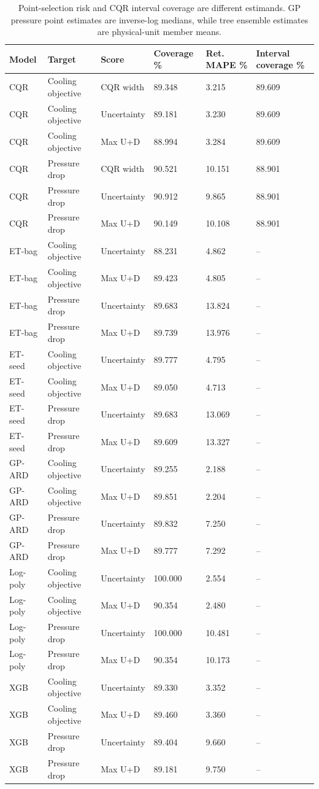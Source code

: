 \begin{table}[htbp]\centering\small\setlength{\tabcolsep}{3pt}\begin{tabular}{llllll}
\toprule
Model & Target & Score & Coverage \% & Ret. MAPE \% & Interval coverage \%\\\midrule
CQR & Cooling objective & CQR width & 89.348 & 3.215 & 89.609\\
CQR & Cooling objective & Uncertainty & 89.181 & 3.230 & 89.609\\
CQR & Cooling objective & Max U+D & 88.994 & 3.284 & 89.609\\
CQR & Pressure drop & CQR width & 90.521 & 10.151 & 88.901\\
CQR & Pressure drop & Uncertainty & 90.912 & 9.865 & 88.901\\
CQR & Pressure drop & Max U+D & 90.149 & 10.108 & 88.901\\
ET-bag & Cooling objective & Uncertainty & 88.231 & 4.862 & --\\
ET-bag & Cooling objective & Max U+D & 89.423 & 4.805 & --\\
ET-bag & Pressure drop & Uncertainty & 89.683 & 13.824 & --\\
ET-bag & Pressure drop & Max U+D & 89.739 & 13.976 & --\\
ET-seed & Cooling objective & Uncertainty & 89.777 & 4.795 & --\\
ET-seed & Cooling objective & Max U+D & 89.050 & 4.713 & --\\
ET-seed & Pressure drop & Uncertainty & 89.683 & 13.069 & --\\
ET-seed & Pressure drop & Max U+D & 89.609 & 13.327 & --\\
GP-ARD & Cooling objective & Uncertainty & 89.255 & 2.188 & --\\
GP-ARD & Cooling objective & Max U+D & 89.851 & 2.204 & --\\
GP-ARD & Pressure drop & Uncertainty & 89.832 & 7.250 & --\\
GP-ARD & Pressure drop & Max U+D & 89.777 & 7.292 & --\\
Log-poly & Cooling objective & Uncertainty & 100.000 & 2.554 & --\\
Log-poly & Cooling objective & Max U+D & 90.354 & 2.480 & --\\
Log-poly & Pressure drop & Uncertainty & 100.000 & 10.481 & --\\
Log-poly & Pressure drop & Max U+D & 90.354 & 10.173 & --\\
XGB & Cooling objective & Uncertainty & 89.330 & 3.352 & --\\
XGB & Cooling objective & Max U+D & 89.460 & 3.360 & --\\
XGB & Pressure drop & Uncertainty & 89.404 & 9.660 & --\\
XGB & Pressure drop & Max U+D & 89.181 & 9.750 & --\\
\bottomrule\end{tabular}\caption{Point-selection risk and CQR interval coverage are different estimands. GP pressure point estimates are inverse-log medians, while tree ensemble estimates are physical-unit member means.}\label{tab:ubend-competitors}\end{table}
